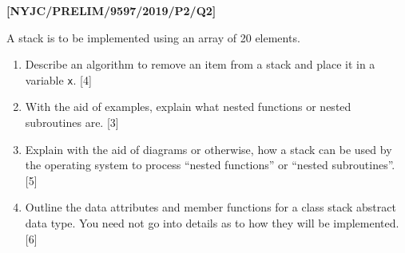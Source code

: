 \item \textbf{{[}NYJC/PRELIM/9597/2019/P2/Q2{]} }

A stack is to be implemented using an array of 20 elements. 
\begin{enumerate}
\item Describe an algorithm to remove an item from a stack and place it
in a variable \texttt{x}. \hfill{}{[}4{]}
\item With the aid of examples, explain what nested functions or nested
subroutines are. \hfill{} {[}3{]}
\item Explain with the aid of diagrams or otherwise, how a stack can be
used by the operating system to process \textquotedblleft nested functions\textquotedblright{}
or \textquotedblleft nested subroutines\textquotedblright . \hfill{}{[}5{]}
\item Outline the data attributes and member functions for a class stack
abstract data type. You need not go into details as to how they will
be implemented. \hfill{}{[}6{]}
\end{enumerate}
